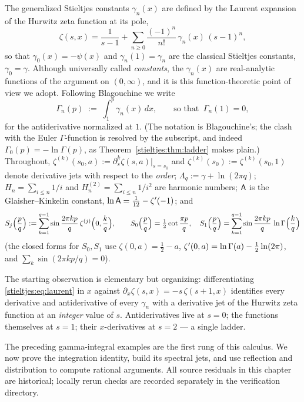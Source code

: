 The generalized Stieltjes constants $\gamma_n(x)$ are defined by the Laurent
expansion of the Hurwitz zeta function at its pole,
\begin{equation}\label{stieltjes:eq:laurent}
\zeta(s,x)=\frac{1}{s-1}+\sum_{n\ge0}\frac{(-1)^n}{n!}\,\gamma_n(x)\,(s-1)^n ,
\end{equation}
so that $\gamma_0(x)=-\psi(x)$ and $\gamma_n(1)=\gamma_n$ are the classical
Stieltjes constants, $\gamma_0=\gamma$. Although universally called
\emph{constants}, the $\gamma_n(x)$ are real-analytic functions of the
argument on $(0,\infty)$, and it is this function-theoretic point of view we
adopt. Following Blagouchine \cite{stieltjes:BlagouchineRJ,bridge:BlagouchineJNT} we write
\[
\Gamma_{\!n}(p)\;:=\;\int_1^p\gamma_n(x)\,dx ,
\qquad\text{so that }\ \Gamma_{\!n}(1)=0 ,
\]
for the antiderivative normalized at $1$. (The notation is Blagouchine's; the
clash with the Euler $\Gamma$-function is resolved by the subscript, and
indeed $\Gamma_{\!0}(p)=-\ln\Gamma(p)$, as Theorem~\ref{stieltjes:thm:ladder} makes
plain.) Throughout, $\zeta^{(k)}(s_0,a):=\partial_s^k\zeta(s,a)\big|_{s=s_0}$
and $\zeta^{(k)}(s_0):=\zeta^{(k)}(s_0,1)$ denote derivative jets with respect
to the \emph{order}; $\Lambda_q:=\gamma+\ln(2\pi q)$; $H_n=\sum_{i\le n}1/i$ and
$H_n^{(2)}=\sum_{i\le n}1/i^2$ are harmonic numbers; $\mathsf{A}$ is the
Glaisher--Kinkelin constant, $\ln\mathsf{A}=\tfrac1{12}-\zeta'(-1)$; and
\[
S_j\Bigl(\frac pq\Bigr):=\sum_{k=1}^{q-1}\sin\frac{2\pi kp}{q}\,
\zeta^{(j)}\Bigl(0,\frac kq\Bigr),
\qquad
S_0\Bigl(\frac pq\Bigr)=\tfrac12\cot\frac{\pi p}{q},
\quad
S_1\Bigl(\frac pq\Bigr)=\sum_{k=1}^{q-1}\sin\frac{2\pi kp}{q}\,\ln\Gamma\Bigl(\frac kq\Bigr)
\]
(the closed forms for $S_0,S_1$ use $\zeta(0,a)=\tfrac12-a$,
$\zeta'(0,a)=\ln\Gamma(a)-\tfrac12\ln(2\pi)$, and
$\sum_k\sin(2\pi kp/q)=0$).

The starting observation is elementary but organizing: differentiating
\eqref{stieltjes:eq:laurent} in $x$ against $\partial_x\zeta(s,x)=-s\,\zeta(s+1,x)$
identifies every derivative and antiderivative of every $\gamma_n$ with a
derivative jet of the Hurwitz zeta function at an \emph{integer} value of
$s$. Antiderivatives live at $s=0$; the functions themselves at $s=1$; their
$x$-derivatives at $s=2$ \cite{stieltjes:Coffey} — a single ladder.

The preceding gamma-integral examples are the first rung of this
calculus. We now prove the integration identity, build its spectral jets,
and use reflection and distribution to compute rational arguments.
All source residuals in this chapter are historical; locally rerun checks
are recorded separately in the verification directory.

